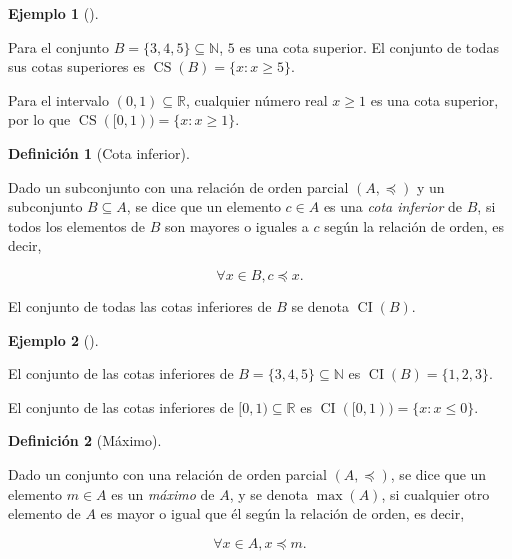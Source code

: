 \documentclass[
  a4paper,
]{scrreport}
\theoremstyle{plain}
\theoremstyle{plain}
\theoremstyle{definition}
\newtheorem{definition}{Definición}[chapter]
\theoremstyle{definition}
\newtheorem{example}{Ejemplo}[chapter]
\theoremstyle{plain}
\theoremstyle{remark}
\begin{document}
\begin{example}[]\protect\hypertarget{exm-cota-superior}{}\label{exm-cota-superior}

Para el conjunto \(B=\{3, 4, 5\}\subseteq \mathbb{N}\), \(5\) es una
cota superior. El conjunto de todas sus cotas superiores es
\(\operatorname{CS}(B)=\{x:x\geq 5\}\).

Para el intervalo \((0,1)\subseteq \mathbb{R}\), cualquier número real
\(x\geq 1\) es una cota superior, por lo que
\(\operatorname{CS}([0,1)) = \{x:x\geq 1\}\).

\end{example}

\begin{definition}[Cota
inferior]\protect\hypertarget{def-cota-inferior-conjunto}{}\label{def-cota-inferior-conjunto}

Dado un subconjunto con una relación de orden parcial \((A,\preceq)\) y
un subconjunto \(B\subseteq A\), se dice que un elemento \(c\in A\) es
una \emph{cota inferior} de \(B\), si todos los elementos de \(B\) son
mayores o iguales a \(c\) según la relación de orden, es decir,

\[\forall x \in B, c\preceq x.\]

El conjunto de todas las cotas inferiores de \(B\) se denota
\(\operatorname{CI}(B)\).

\end{definition}

\begin{example}[]\protect\hypertarget{exm-cota-inferior}{}\label{exm-cota-inferior}

El conjunto de las cotas inferiores de
\(B=\{3, 4, 5\}\subseteq \mathbb{N}\) es
\(\operatorname{CI}(B)=\{1, 2, 3\}\).

El conjunto de las cotas inferiores de \([0,1)\subseteq \mathbb{R}\) es
\(\operatorname{CI}([0,1)) = \{x:x\leq 0\}\).

\end{example}

\begin{definition}[Máximo]\protect\hypertarget{def-maximo-conjunto}{}\label{def-maximo-conjunto}

Dado un conjunto con una relación de orden parcial \((A,\preceq)\), se
dice que un elemento \(m\in A\) es un \emph{máximo} de \(A\), y se
denota \(\max(A)\), si cualquier otro elemento de \(A\) es mayor o igual
que él según la relación de orden, es decir,

\[\forall x \in A, x\preceq m.\]

\end{definition}
\end{document}
